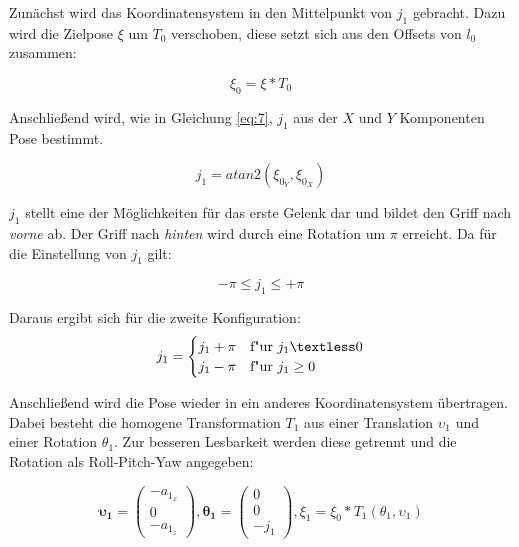 Zunächst wird das Koordinatensystem in den Mittelpunkt von $j_1$ gebracht. Dazu wird die Zielpose $\xi$ um $T_0$ verschoben, diese setzt sich aus den Offsets von $l_0$ zusammen:

\begin{equation}
\xi_0 = \xi * T_0
\label{eq:15}
\end{equation}

Anschließend wird, wie in Gleichung \ref{eq:7}, $j_1$ aus der $X$ und $Y$ Komponenten Pose bestimmt.

\begin{equation}
j_1 = atan2(\xi_{0_Y},\xi_{0_X})
\label{eq:16}
\end{equation}

$j_1$ stellt eine der Möglichkeiten für das erste Gelenk dar und bildet den Griff nach \textit{vorne} ab. Der Griff nach \textit{hinten} wird durch eine Rotation um $\pi$ erreicht. Da für die Einstellung von $j_1$ gilt:

\begin{equation}
-\pi \leq j_1 \leq +\pi 
\label{eq:17}
\end{equation}

Daraus ergibt sich für die zweite Konfiguration:
\begin{equation}
j_1 = 
\begin{cases}
j_1 + \pi & \text{f"ur } j_1  \textless 0 \\
j_1 - \pi & \text{f"ur } j_1  \ge 0 
\end{cases}
\label{eq:18}
\end{equation}

Anschließend wird die Pose wieder in ein anderes Koordinatensystem übertragen. Dabei besteht die homogene Transformation $T_1$ aus einer Translation $\upsilon_1$ und einer Rotation $\theta_1$. Zur besseren Lesbarkeit werden diese getrennt und die Rotation als Roll-Pitch-Yaw angegeben:

\begin{equation}
\pmb{\upsilon_1} = \left(\begin{array}{c} 
-a_{1_x} \\
0\\
-a_{1_z}
\end{array}\right)
,
\pmb{\theta_1} = \left(\begin{array}{c} 
0 \\
0\\
-j_1
\end{array}\right)	
,
\xi_1 = \xi_0 * T_1(\theta_1, \upsilon_1)	
\label{eq:19}
\end{equation}

